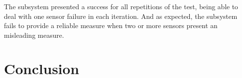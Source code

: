 \documentclass[12pt]{article}
\begin{document}
The subsystem presented a success for all repetitions of the test, being able to deal with one sensor failure in each
iteration. And as expected, the subsystem fails to provide a reliable measure when two or more sensors present an 
misleading measure.

\section{Conclusion}



\end{document}
